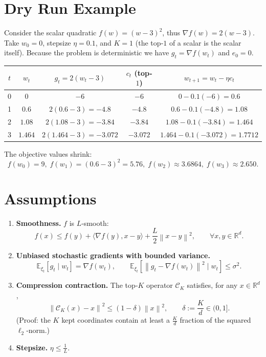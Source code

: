 \documentclass{article}
\newcommand{\E}{\mathbb{E}}
\newcommand{\R}{\mathbb{R}}
\newcommand{\norm}[1]{\left\|#1\right\|}
\newcommand{\cK}{\mathcal{C}_{K}}
\begin{document}
\section*{Dry Run Example}
Consider the scalar quadratic $f(w)=(w-3)^{2}$, thus $\nabla f(w)=2(w-3)$.  
Take $w_{0}=0$, stepsize $\eta=0.1$, and $K=1$ (the top‑$1$ of a scalar is the scalar itself).  
Because the problem is deterministic we have $g_{t}=\nabla f(w_{t})$ and $e_{0}=0$.

\begin{center}
\begin{tabular}{c|c|c|c|c}
$t$ & $w_{t}$ & $g_{t}=2(w_{t}-3)$ & $c_{t}$ (top‑$1$) & $w_{t+1}=w_{t}-\eta c_{t}$ \\ \hline
0 & $0$ & $-6$ & $-6$ & $0-0.1(-6)=0.6$ \\ \hline
1 & $0.6$ & $2(0.6-3)=-4.8$ & $-4.8$ & $0.6-0.1(-4.8)=1.08$ \\ \hline
2 & $1.08$ & $2(1.08-3)=-3.84$ & $-3.84$ & $1.08-0.1(-3.84)=1.464$ \\ \hline
3 & $1.464$ & $2(1.464-3)=-3.072$ & $-3.072$ & $1.464-0.1(-3.072)=1.7712$
\end{tabular}
\end{center}

The objective values shrink:
\[
f(w_{0})=9,\; f(w_{1})=(0.6-3)^{2}=5.76,\; f(w_{2})\approx3.6864,\; f(w_{3})\approx2.650.
\]

\section*{Assumptions}
\begin{enumerate}[label=(A\arabic*)]
\item \textbf{Smoothness.} $f$ is $L$‑smooth:
\[
f(x)\le f(y)+\langle\nabla f(y),x-y\rangle+\frac{L}{2}\norm{x-y}^{2},
\qquad\forall x,y\in\R^{d}. \tag{A1}
\]
\item \textbf{Unbiased stochastic gradients with bounded variance.}
\[
\E_{\xi_{t}}\!\left[g_{t}\mid w_{t}\right]=\nabla f(w_{t}),\qquad
\E_{\xi_{t}}\!\left[\norm{g_{t}-\nabla f(w_{t})}^{2}\mid w_{t}\right]\le\sigma^{2}. \tag{A2}
\]
\item \textbf{Compression contraction.} The top‑$K$ operator $\cK$ satisfies, for any $x\in\R^{d}$,
\[
\norm{\cK(x)-x}^{2}\le (1-\delta)\norm{x}^{2},\qquad\delta:=\frac{K}{d}\in(0,1]. \tag{A3}
\]
(Proof: the $K$ kept coordinates contain at least a $\frac{K}{d}$ fraction of the squared $\ell_{2}$‑norm.)
\item \textbf{Stepsize.} $\eta\le \frac{1}{L}$.
\end{enumerate}
\end{document}
